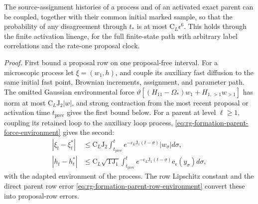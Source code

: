 The source-assignment histories of a process and of an activated exact parent
can be coupled, together with their common initial marked sample, so that the
probability of any disagreement through \(t_*\) is at most
\(\mathrm C_L\epsilon^6\). This holds through the finite activation lineage,
for the full finite-state path with arbitrary label correlations and the
rate-one proposal clock. 

\noindent\emph{Proof.}
First bound a proposal row on one proposal-free interval. For a microscopic
process let \(\xi=(w_1,h)\), and couple its auxiliary fast diffusion to the
same initial fast point, Brownian increments, assignment, and parameter path.
The omitted Gaussian environmental force
\(\vartheta[(H_{11}-\Omega_*)w_1+H_{1,>1}w_{>1}]\) has norm at most
\(\mathrm C_L\mathrm J_2|w|\), and strong contraction from the most recent
proposal or activation time \(t_{\mathrm{prev}}\) gives the first bound below.
For a parent at level \(\ell\ge1\), coupling its retained loop to the
auxiliary loop process, \cref{eq:rg-formation-parent-force-environment} gives
the second:
\begin{align}
 |\xi_t-\xi_t^*|
 &\le \mathrm C_L\mathrm J_2\int_{t_{\mathrm{prev}}}^t
             e^{-\mathrm c_L\mathrm J_1(t-\sigma)}|w_\sigma| d\sigma,
 \label{eq:rg-formation-fast-environment-coupling}\\
 |h_t-h_t^*|
 &\le \mathrm C_L\sqrt{\mathrm T\mathrm J_1}
       \int_{t_{\mathrm{prev}}}^t e^{-\mathrm c_L\mathrm J_1(t-\sigma)}\mathrm e_\epsilon(y_\sigma) d\sigma,
 \label{eq:rg-formation-loop-environment-coupling}
\end{align}
with the adapted environment of the process. The row Lipschitz constant and
the direct parent row error \cref{eq:rg-formation-parent-row-environment}
convert these into proposal-row errors.

